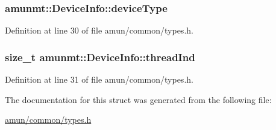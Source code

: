 \subsubsection[{\texorpdfstring{device\+Type}{deviceType}}]{ amunmt\+::\+Device\+Info\+::device\+Type}\hypertarget{structamunmt_1_1DeviceInfo_a31a1a7886be3f6468888584ae87332d9}{}\label{structamunmt_1_1DeviceInfo_a31a1a7886be3f6468888584ae87332d9}


Definition at line 30 of file amun/common/types.\+h.

\subsubsection[{\texorpdfstring{thread\+Ind}{threadInd}}]{\setlength{\rightskip}{0pt plus 5cm}size\+\_\+t amunmt\+::\+Device\+Info\+::thread\+Ind}\hypertarget{structamunmt_1_1DeviceInfo_ab6f553877f91f2905b44af11faaf22c1}{}\label{structamunmt_1_1DeviceInfo_ab6f553877f91f2905b44af11faaf22c1}


Definition at line 31 of file amun/common/types.\+h.



The documentation for this struct was generated from the following file\+:\begin{DoxyCompactItemize}
\item 
\hyperlink{amun_2common_2types_8h}{amun/common/types.\+h}\end{DoxyCompactItemize}
